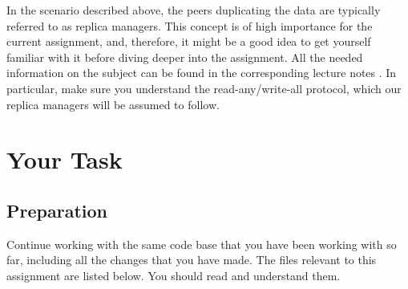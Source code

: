 \documentclass[a4paper]{article}
\begin{document}
In the scenario described above, the peers duplicating the data are typically
referred to as replica managers. This concept is of high importance for the
current assignment, and, therefore, it might be a good idea to get yourself
familiar with it before diving deeper into the assignment. All the needed
information on the subject can be found in the corresponding lecture notes
\cite{lecture8}. In particular, make sure you understand the read-any/write-all
protocol, which our replica managers will be assumed to follow.

\section{Your Task}
\subsection{Preparation} 
Continue working with the same code base that you have been working with so far,
including all the changes that you have made. The files relevant to this
assignment are listed below. You should read and understand them.
\end{document}
